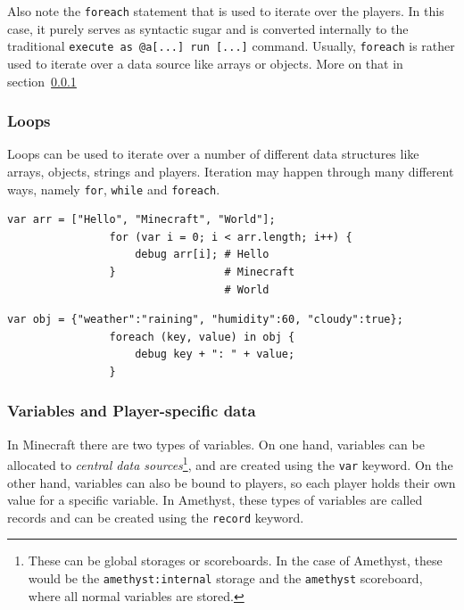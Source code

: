 \documentclass[12pt]{article}
\begin{document}
            Also note the \lstinline{foreach} statement that is used to iterate over the players. In this case, it purely serves as syntactic sugar and is converted internally to the traditional \lstinline[language=Mcfunction]{execute as @a[...] run [...]} command. Usually, \lstinline{foreach} is rather used to iterate over a data source like arrays or objects. More on that in section~\ref{sec:loops}
            
        \subsubsection{Loops} \label{sec:loops}
            Loops can be used to iterate over a number of different data structures like arrays, objects, strings and players. Iteration may happen through many different ways, namely \lstinline{for}, \lstinline{while} and \lstinline{foreach}.
            
            \begin{lstlisting}[title=Iterating over an array of elements with a classic for loop]
                var arr = ["Hello", "Minecraft", "World"];
                for (var i = 0; i < arr.length; i++) {
                    debug arr[i]; # Hello
                }                 # Minecraft 
                                  # World
            \end{lstlisting}
            
            \begin{lstlisting}[title=Iterating over elements of an object with a foreach loop]
                var obj = {"weather":"raining", "humidity":60, "cloudy":true};
                foreach (key, value) in obj {
                    debug key + ": " + value;
                }
            \end{lstlisting}
            
        \subsubsection{Variables and Player-specific data}
            In Minecraft there are two types of variables. On one hand, variables can be allocated to \textit{central data sources}\footnote{These can be global storages or scoreboards. In the case of Amethyst, these would be the \lstinline{amethyst:internal} storage and the \lstinline{amethyst} scoreboard, where all normal variables are stored.}, and are created using the \lstinline{var} keyword. On the other hand, variables can also be bound to players, so each player holds their own value for a specific variable. In Amethyst, these types of variables are called records and can be created using the \lstinline{record} keyword.
            
\end{document}
